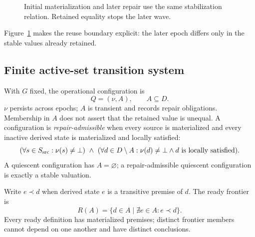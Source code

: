 \iffullvisuals
\begin{figure}[t]
\centering
{}
\caption{Initial materialization and later repair use the same stabilization relation. Retained equality stops the later wave.}\label{fig:repair-example}
\end{figure}
Figure~\ref{fig:repair-example} makes the reuse boundary explicit: the later epoch differs only in the stable values already retained.
\fi

\subsection{Finite active-set transition system}
With $G$ fixed, the operational configuration is
\begin{equation}Q=(\nu,A),\qquad A\subseteq D.\label{eq:config}\end{equation}
$\nu$ persists across epochs; $A$ is transient and records repair obligations. Membership in $A$ does not assert that the retained value is unequal. A configuration is \emph{repair-admissible} when every source is materialized and every inactive derived state is materialized and locally satisfied:
\begin{equation}
(\forall s\in S_{\src}:\nu(s)\neq\botv)\ \land\ (\forall d\in D\setminus A:\nu(d)\neq\botv\land d\text{ is locally satisfied}).
\label{eq:admissible}
\end{equation}
A quiescent configuration has $A=\varnothing$; a repair-admissible quiescent configuration is exactly a stable valuation.

Write $e\prec d$ when derived state $e$ is a transitive premise of $d$. The ready frontier is
\begin{equation}R(A)=\{d\in A\mid \nexists e\in A:e\prec d\}.\label{eq:ready}\end{equation}
Every ready definition has materialized premises; distinct frontier members cannot depend on one another and have distinct conclusions.

